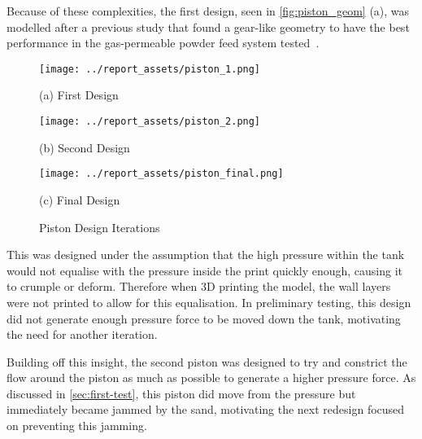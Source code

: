 Because of these complexities, the first design, seen in \autoref{fig:piston_geom} (a), was modelled after a previous study that found a gear-like geometry to have the best performance in the gas-permeable powder feed system tested~\cite{TANG2023118406}. 
\begin{figure}[htbp]
    \centering
    
    \begin{minipage}{0.29\textwidth}
        \centering
        \texttt{[image: ../report\_assets/piston\_1.png]}
        \caption*{(a) First Design}\label{fig:piston_geom_1}
    \end{minipage}
    \hfill
    \begin{minipage}{0.29\textwidth}
        \centering
        \texttt{[image: ../report\_assets/piston\_2.png]}
        \caption*{(b) Second Design}\label{fig:piston_geom_2}
    \end{minipage}
    \hfill
    \begin{minipage}{0.29\textwidth}
        \centering
        \texttt{[image: ../report\_assets/piston\_final.png]}
        \caption*{(c) Final Design}\label{fig:piston_geom_3}
    \end{minipage}
    \caption{Piston Design Iterations}\label{fig:piston_geom}
\end{figure}
This was designed under the assumption that the high pressure within the tank would not equalise with the pressure inside the print quickly enough, causing it to crumple or deform. Therefore when 3D printing the model, the wall layers were not printed to allow for this equalisation. In preliminary testing, this design did not generate enough pressure force to be moved down the tank, motivating the need for another iteration.

Building off this insight, the second piston was designed to try and constrict the flow around the piston as much as possible to generate a higher pressure force. As discussed in \autoref{sec:first-test}, this piston did move from the pressure but immediately became jammed by the sand, motivating the next redesign focused on preventing this jamming.

